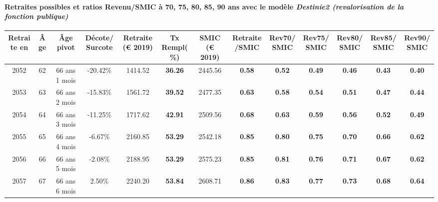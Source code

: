 \paragraph{Retraites possibles et ratios Revenu/SMIC à 70, 75, 80, 85, 90 ans avec le modèle \emph{Destinie2 (revalorisation de la fonction publique)}}  
 
{ \scriptsize \begin{center} 
\begin{tabular}[htb]{|c|c||c|c||c|c||c||c|c|c|c|c|c|} 
\hline 
 Retraite en &  Âge &  Âge pivot &  Décote/Surcote &  Retraite (\euro{} 2019) &  Tx Rempl(\%) &  SMIC (\euro{} 2019) &  Retraite/SMIC &  Rev70/SMIC &  Rev75/SMIC &  Rev80/SMIC &  Rev85/SMIC &  Rev90/SMIC \\ 
\hline \hline 
 2052 &  62 &  66 ans 1 mois &  -20.42\% &  1414.52 &  {\bf 36.26} &  2445.56 &  {\bf {\color{red} 0.58}} &  {\bf {\color{red} 0.52}} &  {\bf {\color{red} 0.49}} &  {\bf {\color{red} 0.46}} &  {\bf {\color{red} 0.43}} &  {\bf {\color{red} 0.40}} \\ 
\hline 
 2053 &  63 &  66 ans 2 mois &  -15.83\% &  1561.72 &  {\bf 39.52} &  2477.35 &  {\bf {\color{red} 0.63}} &  {\bf {\color{red} 0.58}} &  {\bf {\color{red} 0.54}} &  {\bf {\color{red} 0.51}} &  {\bf {\color{red} 0.47}} &  {\bf {\color{red} 0.44}} \\ 
\hline 
 2054 &  64 &  66 ans 3 mois &  -11.25\% &  1717.62 &  {\bf 42.91} &  2509.56 &  {\bf {\color{red} 0.68}} &  {\bf {\color{red} 0.63}} &  {\bf {\color{red} 0.59}} &  {\bf {\color{red} 0.56}} &  {\bf {\color{red} 0.52}} &  {\bf {\color{red} 0.49}} \\ 
\hline 
 2055 &  65 &  66 ans 4 mois &  -6.67\% &  2160.85 &  {\bf 53.29} &  2542.18 &  {\bf {\color{red} 0.85}} &  {\bf {\color{red} 0.80}} &  {\bf {\color{red} 0.75}} &  {\bf {\color{red} 0.70}} &  {\bf {\color{red} 0.66}} &  {\bf {\color{red} 0.62}} \\ 
\hline 
 2056 &  66 &  66 ans 5 mois &  -2.08\% &  2188.95 &  {\bf 53.29} &  2575.23 &  {\bf {\color{red} 0.85}} &  {\bf {\color{red} 0.81}} &  {\bf {\color{red} 0.76}} &  {\bf {\color{red} 0.71}} &  {\bf {\color{red} 0.67}} &  {\bf {\color{red} 0.62}} \\ 
\hline 
 2057 &  67 &  66 ans 6 mois &  2.50\% &  2240.20 &  {\bf 53.84} &  2608.71 &  {\bf {\color{red} 0.86}} &  {\bf {\color{red} 0.83}} &  {\bf {\color{red} 0.77}} &  {\bf {\color{red} 0.73}} &  {\bf {\color{red} 0.68}} &  {\bf {\color{red} 0.64}} \\ 
\hline 
\hline 
\end{tabular} 
\end{center} } 

